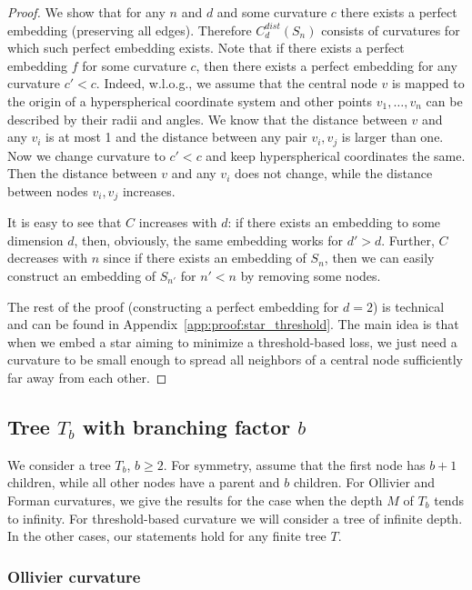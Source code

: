 \documentclass[runningheads]{llncs}
\begin{document}
\begin{proof}

We show that for any $n$ and $d$ and some curvature $c$ there exists a perfect embedding (preserving all edges).
Therefore $C_d^{dist}(S_n)$ consists of curvatures for which such perfect embedding exists. 
Note that if there exists a perfect embedding $f$ for some curvature $c$, then there exists a perfect embedding for any curvature $c' < c$. Indeed, w.l.o.g., we assume that the central node $v$ is mapped to the origin of a hyperspherical coordinate system and other points $v_1, \ldots, v_n$ can be described by their radii and angles. We know that the distance between $v$ and any $v_i$ is at most 1 and the distance between any pair $v_i, v_j$ is larger than one. Now we change curvature to $c' < c$ and keep hyperspherical coordinates the same. Then the distance between $v$ and any $v_i$ does not change, while the distance between nodes $v_i, v_j$ increases.

It is easy to see that $C$ increases with $d$: if there exists an embedding to some dimension $d$, then, obviously, the same embedding works for $d' > d$. Further, $C$ decreases with $n$ since if there exists an embedding of $S_n$, then we can easily construct an embedding of $S_{n'}$ for $n' < n$ by removing some nodes. 

The rest of the proof (constructing a perfect embedding for $d = 2$) is technical and can be found in Appendix~\ref{app:proof:star_threshold}. The main idea is that when we embed a star aiming to minimize a threshold-based loss, we just need a curvature to be small enough to spread all neighbors of a central node sufficiently far away from each other.

\end{proof}

\subsection{Tree $T_b$ with branching factor $b$}

We consider a tree $T_b$, $b \ge 2$. For symmetry, assume that the first node has $b+1$ children, while all other nodes have a parent and $b$ children. For Ollivier and Forman curvatures, we give the results for the case when the depth $M$ of $T_b$ tends to infinity. For threshold-based curvature we will consider a tree of infinite depth. In the other cases, our statements hold for any finite tree $T$.

\subsubsection{Ollivier curvature} 
\end{document}

